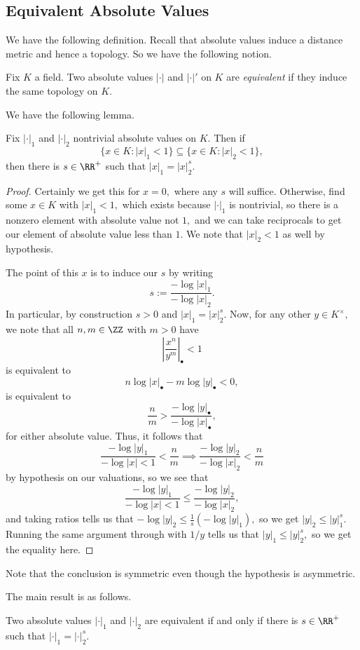 \subsection{Equivalent Absolute Values}
We have the following definition. Recall that absolute values induce a distance metric and hence a topology. So we have the following notion.
\begin{definition}[Equivalent]
	Fix $K$ a field. Two absolute values $|\cdot|$ and $|\cdot|'$ on $K$ are \textit{equivalent} if they induce the same topology on $K.$
\end{definition}
We have the following lemma.
\begin{lemma} \label{lem:eqabsvals}
	Fix $|\cdot|_1$ and $|\cdot|_2$ nontrivial absolute values on $K.$ Then if
	\[\{x\in K:|x|_1<1\}\subseteq\{x\in K:|x|_2<1\},\]
	then there is $s\in\RR^+$ such that $|x|_1=|x|_2^s.$
\end{lemma}
\begin{proof}
	Certainly we get this for $x=0,$ where any $s$ will suffice. Otherwise, find some $x\in K$ with $|x|_1<1,$ which exists because $|\cdot|_1$ is nontrivial, so there is a nonzero element with absolute value not $1,$ and we can take reciprocals to get our element of absolute value less than $1.$ We note that $|x|_2<1$ as well by hypothesis.

	The point of this $x$ is to induce our $s$ by writing
	\[s:=\frac{-\log|x|_1}{-\log|x|_2}.\]
	In particular, by construction $s>0$ and $|x|_1=|x|_2^s.$ Now, for any other $y\in K^\times,$ we note that all $n,m\in\ZZ$ with $m>0$ have
	\[\left|\frac{x^n}{y^m}\right|_\bullet<1\]
	is equivalent to
	\[n\log|x|_\bullet-m\log|y|_\bullet<0,\]
	is equivalent to
	\[\frac nm>\frac{-\log|y|_\bullet}{-\log|x|_\bullet},\]
	for either absolute value. Thus, it follows that
	\[\frac{-\log|y|_1}{-\log|x|<1}<\frac nm\implies\frac{-\log|y|_2}{-\log|x|_2}<\frac nm\]
	by hypothesis on our valuations, so we see that
	\[\frac{-\log|y|_1}{-\log|x|<1}\le\frac{-\log|y|_2}{-\log|x|_2},\]
	and taking ratios tells us that $-\log|y|_2\le\frac1s(-\log|y|_1),$ so we get $|y|_2\le|y|_1^s.$ Running the same argument through with $1/y$ tells us that $|y|_1\le|y|_2^s,$ so we get the equality here.
\end{proof}
\begin{remark}
	Note that the conclusion is symmetric even though the hypothesis is asymmetric.
\end{remark}
The main result is as follows.
\begin{proposition}
	Two absolute values $|\cdot|_1$ and $|\cdot|_2$ are equivalent if and only if there is $s\in\RR^+$ such that $|\cdot|_1=|\cdot|_2^s.$
\end{proposition}

